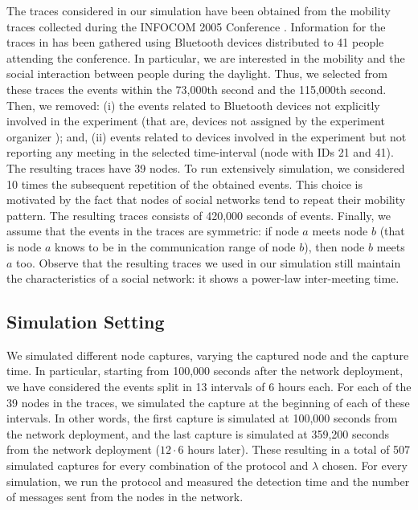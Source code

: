 \documentclass{IEEEconf}
\begin{document}
The traces considered in our simulation have been obtained from
the mobility traces collected during the INFOCOM 2005 Conference \cite{CRAWDAD-INFOCOM}. Information for the traces in \cite{CRAWDAD-INFOCOM} has been gathered using Bluetooth devices distributed to 41 people attending the conference. In particular, we are interested in the mobility and the social interaction between people during the daylight. Thus, we selected from these traces the events within the 73,000th second and the 115,000th second. Then, we removed:  (i) the events related to Bluetooth devices not explicitly involved in the experiment (that are, devices not assigned by the experiment organizer \cite{CRAWDAD-INFOCOM}); and, (ii) events related to devices involved in the experiment but not reporting any meeting in the selected time-interval (node with IDs 21 and 41). The resulting traces have 39 nodes.
To run extensively simulation, we considered 10 times the subsequent repetition of the obtained events. This choice is motivated by the fact that nodes of social networks tend to repeat their mobility pattern.
The resulting traces consists of 420,000 seconds of events.
Finally, we assume that the events in the traces are symmetric: if node $a$ meets node $b$ (that is node $a$ knows to be in the communication range of node $b$), then node $b$ meets $a$ too. Observe that the resulting traces we used in our simulation still maintain the characteristics of a social network: it shows a power-law inter-meeting time. 





\subsection{Simulation Setting}
\label{simSetting}
We simulated different node captures, varying the captured node and the capture time. In particular, starting from 100,000 seconds after the network deployment, we have considered the events split in 13 intervals of 6 hours each. For each of the 39 nodes in the traces, we simulated the capture at the beginning of each of these intervals. In other words, the first capture is simulated at 100,000 seconds from the network deployment, and the last capture is simulated at 359,200 seconds from the network deployment ($12\cdot6$ hours later). These resulting in a total of 507 simulated captures for every combination of the protocol and $\lambda$ chosen. For every simulation, we run the protocol and measured the detection time and the number of messages sent from the nodes in the network.
\end{document}
